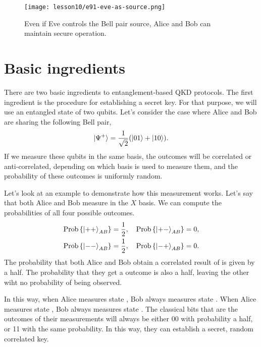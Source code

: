 \begin{figure}[H]
    \centering
    \texttt{[image: lesson10/e91-eve-as-source.png]}
        \caption[E91 with Eve as Bell pair source]{Even if Eve controls the Bell pair source, Alice and Bob can maintain secure operation.}
    \label{fig:eve-e91}
\end{figure}





\section{Basic ingredients}
\label{sec:E91-basic-ingredients}

There are two basic ingredients to entanglement-based QKD protocols.
The first ingredient is the procedure for establishing a secret key.
For that purpose, we will use an entangled state of two qubits.
Let's consider the case where Alice and Bob are sharing the following Bell pair,
\begin{align}
    |\Psi^{+}\rangle = \frac{1}{\sqrt{2}}(\left| 01 \right\rangle+\left| 10 \right\rangle).
\end{align}
If we measure these qubits in the same basis, the outcomes will be
correlated or anti-correlated, depending on which basis is used to measure them, and the probability of these outcomes is uniformly random.

Let's look at an example to demonstrate how this measurement works.
Let's say that both Alice and Bob measure in the $X$ basis.
We can compute the probabilities of all four possible outcomes.
\begin{align}
\begin{aligned}
    \operatorname{Prob}\left\{\left| ++ \right\rangle_{A B}\right\} & = \frac{1}{2}, \quad  \operatorname{Prob}\left\{\left| +- \right\rangle_{A B}\right\} = 0, \\
    \operatorname{Prob}\left\{\left| -- \right\rangle_{A B}\right\} & = \frac{1}{2}, \quad \operatorname{Prob}\left\{\left| -+ \right\rangle_{A B}\right\} = 0.
\end{aligned}
\end{align}
The probability that both Alice and Bob obtain a correlated result of \ket{++} is given by a half.
The probability that they get a \ket{--} outcome is also a half,
leaving the other wiht no probability of being observed.

In this way, when Alice measures state \ket{+}, Bob always measures state \ket{+}.
When Alice measures state \ket{-}, Bob always measures state \ket{-}.
The classical bits that are the outcomes of their measurements will always be either 00 with probability a half, or 11 with the same probability.
In this way, they can establish a secret, random correlated key.

